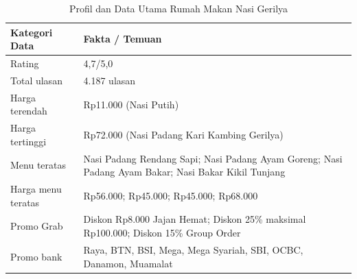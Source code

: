 \begin{table}[h!]
    \centering
    \caption{Profil dan Data Utama Rumah Makan Nasi Gerilya}
    \label{tab:data_gerilya}
    \begin{tabularx}{\textwidth}{lY}
        \toprule
        \textbf{Kategori Data} & \textbf{Fakta / Temuan}                                                                             \\
        \midrule
        Rating                 & 4,7/5,0                                                                                             \\
        Total ulasan           & 4.187 ulasan                                                                                        \\
        Harga terendah         & Rp11.000 (Nasi Putih)                                                                               \\
        Harga tertinggi        & Rp72.000 (Nasi Padang Kari Kambing Gerilya)                                                         \\
        Menu teratas           & Nasi Padang Rendang Sapi; Nasi Padang Ayam Goreng; Nasi Padang Ayam Bakar; Nasi Bakar Kikil Tunjang \\
        Harga menu teratas     & Rp56.000; Rp45.000; Rp45.000; Rp68.000                                                              \\
        Promo Grab             & Diskon Rp8.000 Jajan Hemat; Diskon 25\% maksimal Rp100.000; Diskon 15\% Group Order                 \\
        Promo bank             & Raya, BTN, BSI, Mega, Mega Syariah, SBI, OCBC, Danamon, Muamalat                                    \\
        \bottomrule
    \end{tabularx}
\end{table}

